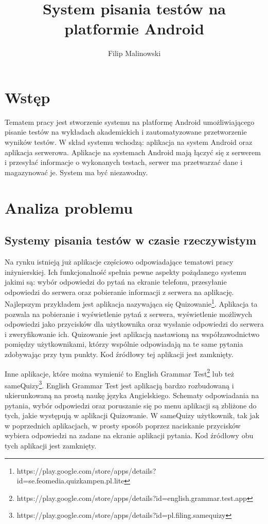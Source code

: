 \documentclass[eng]{mgr}
\title{System pisania testów na platformie Android}
\author{Filip Malinowski}
\begin{document}
\maketitle

\tableofcontents

	\chapter*{Wstęp}
	
	Tematem pracy jest stworzenie systemu na platformę Android umożliwiającego pisanie testów na wykładach akademickich i zautomatyzowane przetworzenie wyników testów. W skład systemu wchodzą: aplikacja na system Android oraz aplikacja serwerowa. Aplikacje na systemach Android mają łączyć się z serwerem i przesyłać informacje o wykonanych testach, serwer ma przetwarzać dane i magazynować je. System ma być niezawodny.

	
	\chapter{Analiza problemu}
	
		\section{Systemy pisania testów w czasie rzeczywistym}
		Na rynku istnieją już aplikacje częściowo odpowiadające tematowi pracy inżynierskiej. Ich funkcjonalność spełnia pewne aspekty pożądanego systemu jakimi są: wybór odpowiedzi do pytań na ekranie telefonu, przesyłanie odpowiedzi do serwera oraz pobieranie informacji z serwera na aplikację. Najlepszym przykładem jest aplikacja nazywająca się Quizowanie\footnote{https://play.google.com/store/apps/details?id=se.feomedia.quizkampen.pl.lite}. Aplikacja ta pozwala na pobieranie i wyświetlenie pytań z serwera, wyświetlenie możliwych odpowiedzi jako przycisków dla użytkownika oraz wysłanie odpowiedzi do serwera i zweryfikowanie ich. Quizowanie jest aplikacją nastawioną na współzawodnictwo pomiędzy użytkownikami, którzy wspólnie odpowiadają na te same pytania zdobywając przy tym punkty. Kod źródłowy tej aplikacji jest zamknięty.
	
		Inne aplikacje, które można wymienić to English Grammar Test\footnote{https://play.google.com/store/apps/details?id=english.grammar.test.app} lub też sameQuizy\footnote{https://play.google.com/store/apps/details?id=pl.filing.samequizy}. English Grammar Test jest aplikacją bardzo rozbudowaną i ukierunkowaną na prostą naukę języka Angielskiego. Schematy odpowiadania na pytania, wybór odpowiedzi oraz poruszanie się po menu aplikacji są zbliżone do tych, jakie występują w aplikacji Quizowanie. W sameQuizy użytkownik, tak jak w poprzednich aplikacjach, w prosty sposób poprzez naciskanie przycisków wybiera odpowiedzi na zadane na ekranie aplikacji pytania. Kod źródłowy obu tych aplikacji jest zamknięty.
		
\end{document}
